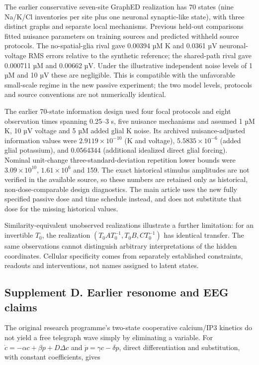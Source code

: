\documentclass[
  11pt,
]{article}
\begin{document}
The earlier conservative seven-site GraphED realization has 70 states
(nine Na/K/Cl inventories per site plus one neuronal synaptic-like
state), with three distinct graphs and separate local mechanisms.
Previous held-out comparisons fitted nuisance parameters on training
sources and predicted withheld source protocols. The no-spatial-glia
rival gave 0.00394 µM K and 0.0361 µV neuronal-voltage RMS errors
relative to the synthetic reference; the shared-path rival gave 0.000711
µM and 0.00662 µV. Under the illustrative independent noise levels of 1
µM and 10 µV these are negligible. This is compatible with the
unfavorable small-scale regime in the new passive experiment; the two
model levels, protocols and source conventions are not numerically
identical.

The earlier 70-state information design used four focal protocols and
eight observation times spanning 0.25--3 s, five nuisance mechanisms and
assumed 1 µM K, 10 µV voltage and 5 µM added glial K noise. Its archived
nuisance-adjusted information values were \(2.9119\times10^{-10}\) (K
and voltage), \(5.5835\times10^{-6}\) (added glial potassium), and
\(0.0564344\) (additional idealized direct glial forcing). Nominal
unit-change three-standard-deviation repetition lower bounds were
\(3.09\times10^{10}\), \(1.61\times10^6\) and 159. The exact historical
stimulus amplitudes are not verified in the available source, so these
numbers are retained only as historical, non-dose-comparable design
diagnostics. The main article uses the new fully specified passive dose
and time schedule instead, and does not substitute that dose for the
missing historical values.

Similarity-equivalent unobserved realizations illustrate a further
limitation: for an invertible \(T_0\), the realization
\((T_0AT_0^{-1},T_0B,CT_0^{-1})\) has identical transfer. The same
observations cannot distinguish arbitrary interpretations of the hidden
coordinates. Cellular specificity comes from separately established
constraints, readouts and interventions, not names assigned to latent
states.

\subsection{Supplement D. Earlier resonome and EEG
claims}\label{supplement-d.-earlier-resonome-and-eeg-claims}

The original research programme's two-state cooperative calcium/IP3
kinetics do not yield a free telegraph wave simply by eliminating a
variable. For \(\dot c=-\alpha c+\beta p+D\Delta c\) and
\(\dot p=\gamma c-\delta p\), direct differentiation and substitution,
with constant coefficients, gives
\end{document}
